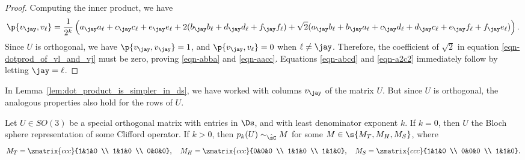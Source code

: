 \documentclass{article}
\begin{document}
\begin{proof}
  Computing the inner product, we have
  \begin{equation}  \label{eqn-dotprod_of_vl_and_vj}
    \p{v_{\jay},v_{\ell}} =
    \frac{1}{2^k}
    \left(
      a_{\jay} a_{\ell}+c_{\jay} c_{\ell}+e_{\jay} e_{\ell}+
      2(b_{\jay} b_{\ell}+d_{\jay} d_{\ell}+f_{\jay} f_{\ell})
      +\sqrt{2}(a_{\jay} b_{\ell}+b_{\jay} a_{\ell}+
      c_{\jay} d_{\ell}+d_{\jay} c_{\ell}+e_{\jay} f_{\ell}+f_{\jay} e_{\ell})
    \right).
  \end{equation}
  Since $U$ is orthogonal, we have $\p{v_{\jay},v_{\jay}}=1$, and
  $\p{v_{\jay},v_{\ell}} = 0$ when $\ell \ne \jay$.
  Therefore, the coefficient of $\sqrt{2}$ in equation
  \eqref{eqn-dotprod_of_vl_and_vj} must be zero, proving
  \eqref{eqn-abba} and \eqref{eqn-aacc}. Equations {\eqref{eqn-abcd}} and
  {\eqref{eqn-a2c2}} immediately follow by letting $\jay=\ell$.
\end{proof}

\begin{remark}
  In Lemma~\ref{lem:dot_product_is_simpler_in_ds}, we have worked with
  columns $v_{\jay}$ of the matrix $U$. But since $U$ is orthogonal, the
  analogous properties also hold for the rows of $U$.
\end{remark}

\begin{lemma}\label{lem:k0-clifford-new}
  Let $U\in SO(3)$ be a special orthogonal matrix with entries in $\Ds$, and
  with least denominator exponent $k$. If $k=0$, then $U$ the Bloch sphere
  representation of some Clifford operator. If $k>0$, then $p_k(U)\sim_{\hat\sC} M$ for some
  $M\in\s{M_T,M_H,M_S}$, where
  \[ M_T =
  \zmatrix{ccc}{1&1&0 \\ 1&1&0 \\ 0&0&0},\quad M_H =
  \zmatrix{ccc}{0&0&0 \\ 1&1&0 \\ 1&1&0},\quad M_S =
  \zmatrix{ccc}{1&1&0 \\ 0&0&0 \\ 1&1&0}.
   \]
\end{lemma}
\end{document}

